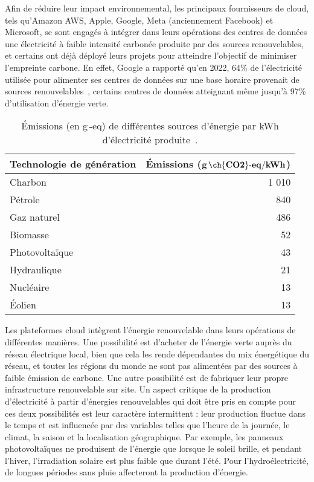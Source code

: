 Afin de réduire leur impact environnemental, les principaux fournisseurs de cloud, tels qu'Amazon AWS, Apple, Google, Meta (anciennement Facebook) et Microsoft, se sont engagés à intégrer dans leurs opérations des centres de données une électricité à faible intensité carbonée produite par des sources renouvelables, et certains ont déjà déployé leurs projets pour atteindre l'objectif de minimiser l'empreinte carbone. En effet, Google a rapporté qu'en 2022, 64\% de l'électricité utilisée pour alimenter ses centres de données sur une base horaire provenait de sources renouvelables~\cite{google_sustainability_report_2023}, certains centres de données atteignant même jusqu'à 97\% d'utilisation d'énergie verte.
\begin{table}[!ht]

\caption{ Émissions (en g\,-eq) de différentes sources d'énergie par kWh d'électricité produite~\cite{nrel_lifecycle_2021}.}\label{tab:co2_power_sources} \centering

\begin{tabular}{|l|r|}
  \hline
  \textbf{Technologie de génération} & \textbf{Émissions ($\mathbf{g\,\ch{CO2}\text{-}eq/kWh}$)}   \\
  \hline  
  Charbon   & 1 010\\  
  \hline
  Pétrole   & 840\\
  \hline
  Gaz naturel   & 486\\
   \hline
  Biomasse   & 52 \\
  \hline
  Photovoltaïque   & 43 \\
  \hline
  Hydraulique & 21 \\
  \hline
  Nucléaire   & 13 \\
  \hline
  Éolien   & 13 \\
  \hline
\end{tabular}
\end{table}


Les plateformes cloud intègrent l'énergie renouvelable dans leurs opérations de différentes manières. Une possibilité est d'acheter de l'énergie verte auprès du réseau électrique local, bien que cela les rende dépendantes du mix énergétique du réseau, et toutes les régions du monde ne sont pas alimentées par des sources à faible émission de carbone. Une autre possibilité est de fabriquer leur propre infrastructure renouvelable sur site. Un aspect critique de la production d'électricité à partir d'énergies renouvelables qui doit être pris en compte pour ces deux possibilités est leur caractère intermittent : leur production fluctue dans le temps et est influencée par des variables telles que l'heure de la journée, le climat, la saison et la localisation géographique. Par exemple, les panneaux photovoltaïques ne produisent de l'énergie que lorsque le soleil brille, et pendant l'hiver, l'irradiation solaire est plus faible que durant l'été. Pour l'hydroélectricité, de longues périodes sans pluie affecteront la production d'énergie.



